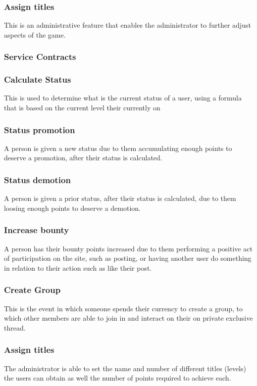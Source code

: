 \documentclass[12pt]{article}
\begin{document}
\subsubsection*{Assign titles}
\par{This is an administrative feature that enables the administrator to further adjust aspects of the game.}

\subsubsection{Service Contracts}
\subsubsection*{Calculate Status}
\par{This is used to determine what is the current status of a user, using a formula that is based on the current level their currently on}
\subsubsection*{Status promotion}
\par{A person is given a new status due to them accumulating enough points to deserve a promotion, after their status is calculated.}
\subsubsection*{Status demotion}
\par{A person is given a prior status, after their status is calculated, due to them loosing enough points to deserve a demotion.}
\subsubsection*{Increase bounty}
\par{A person has their bounty points increased due to them performing a positive act of participation on the site, such as posting, or having another user do something in relation to their action such as like their post.}
\subsubsection*{Create Group}
\par{This is the event in which someone spends their currency to create a group, to which other members are able to join in and interact on their on private exclusive thread.}
\subsubsection*{Assign titles}
\par{The administrator is able to set the name and number of different titles (levels) the users can obtain as well the number of points required to achieve each.}
\end{document}

